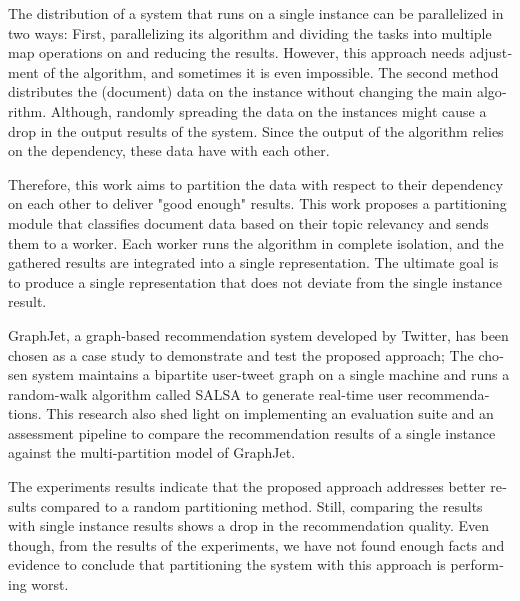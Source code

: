 
\null\vfil
\begin{otherlanguage}{english}
\begin{center}\textsf{\textbf{\abstractname}}\end{center}

\noindent
The distribution of a system that runs on a single instance can be parallelized in two ways: First, parallelizing its algorithm and dividing the tasks into multiple map operations on and reducing the results. However, this approach needs adjustment of the algorithm, and sometimes it is even impossible. The second method distributes the (document) data on the instance without changing the main algorithm. Although, randomly spreading the data on the instances might cause a drop in the output results of the system. Since the output of the algorithm relies on the dependency, these data have with each other.

Therefore, this work aims to partition the data with respect to their dependency on each other to deliver "good enough" results. This work proposes a partitioning module that classifies document data based on their topic relevancy and sends them to a worker. Each worker runs the algorithm in complete isolation, and the gathered results are integrated into a single representation. The ultimate goal is to produce a single representation that does not deviate from the single instance result.

GraphJet, a graph-based recommendation system developed by Twitter, has been chosen as a case study to demonstrate and test the proposed approach; The chosen system maintains a bipartite user-tweet graph on a single machine and runs a random-walk algorithm called SALSA to generate real-time user recommendations. This research also shed light on implementing an evaluation suite and an assessment pipeline to compare the recommendation results of a single instance against the multi-partition model of GraphJet.


The experiments results indicate that the proposed approach addresses better results compared to a random partitioning method. Still, comparing the results with single instance results shows a drop in the recommendation quality. Even though, from the results of the experiments, we have not found enough facts and evidence to conclude that partitioning the system with this approach is performing worst.


\end{otherlanguage}
\vfil\null
\newpage

